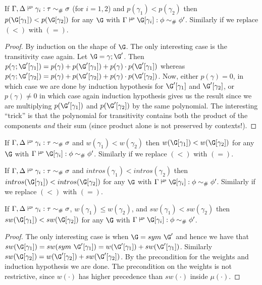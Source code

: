 \documentclass[a4paper,UKenglish]{lipics}
\def\fiddle#1{\hspace*{-0.8ex}\raisebox{0.1ex}{$\scriptscriptstyle#1$}}
\newcommand{\wfco}{\vdash^{\fiddle{\sf{co}}}}
\newcommand{\psim}{\mathrel{\sim_{\tiny \#}}}
\newcommand{\sym}[1]{\mathop{sym}\, #1}
\begin{document}
\begin{lemma} If $\Gamma,\Delta \wfco \gamma_i : \tau \psim \sigma$ (for $i=1,2$) and $p(\gamma_1) < p(\gamma_2)$ then 
$p(\G[\gamma_1]) < p(\G[\gamma_2])$ for any $\G$ with $\Gamma \wfco \G[\gamma_i] : \phi \psim \phi'$.
Similarly if we replace $(<)$ with $(=)$. 
\end{lemma}
\vspace{-10pt}\begin{proof} By induction on the shape of $\G$. The only interesting case is the transitivity case 
again. Let $\G = \gamma ; \G'$. Then $p(\gamma;\G'[\gamma_1]) = p(\gamma) + p(\G'[\gamma_1]) + p(\gamma)\cdot p(\G'[\gamma_1])$ whereas 
$p(\gamma;\G'[\gamma_2]) = p(\gamma) + p(\G'[\gamma_2]) + p(\gamma)\cdot p(\G'[\gamma_2])$. Now, either $p(\gamma) = 0$, in which case we are done
by induction hypothesis for $\G'[\gamma_1]$ and $\G'[\gamma_2]$, or $p(\gamma) \neq 0$ in which case again induction 
hypothesis gives us the result since we are multiplying $p(\G'[\gamma_1])$ and $p(\G'[\gamma_2])$ by the same polynomial.
The interesting ``trick'' is that the polynomial for transitivity contains both the product 
of the components {\em and} their sum (since product alone is not preserved by contexts!).
\end{proof}
\begin{lemma} If $\Gamma,\Delta \wfco \gamma_i : \tau \psim \sigma$ and $w(\gamma_1) < w(\gamma_2)$ then 
$w(\G[\gamma_1]) < w(\G[\gamma_2])$ for any $\G$ with $\Gamma \wfco \G[\gamma_i] : \phi \psim \phi'$.
Similarly if we replace $(<)$ with $(=)$.
\end{lemma}

\begin{lemma} If $\Gamma,\Delta \wfco \gamma_i : \tau \psim \sigma$ and $intros(\gamma_1) < intros(\gamma_2)$ then 
$intros(\G[\gamma_1]) < intros(\G[\gamma_2])$ for any $\G$ with $\Gamma \wfco \G[\gamma_i] : \phi \psim \phi'$.
Similarly if we replace $(<)$ with $(=)$. 
\end{lemma}


\begin{lemma} If $\Gamma,\Delta \wfco \gamma_i : \tau \psim \sigma$, $w(\gamma_1) \leq w(\gamma_2)$, and $sw(\gamma_1) < sw(\gamma_2)$ then 
$sw(\G[\gamma_1]) < sw(\G[\gamma_2])$ for any $\G$ with $\Gamma \wfco \G[\gamma_i] : \phi \psim \phi'$.
\end{lemma}
\vspace{-10pt}\begin{proof} The only interesting case is when $\G = \sym{\G'}$ and hence we have that 
$sw(\G[\gamma_1]) = sw(\sym{\G'[\gamma_1]}) = w(\G'[\gamma_1]) + sw(\G'[\gamma_1])$. 
Similarly $sw(\G[\gamma_2]) = w(\G'[\gamma_2]) + sw(\G'[\gamma_2])$. By the precondition for the weights and induction 
hypothesis we are done. The precondition on the weights is not restrictive, since 
$w(\cdot)$ has higher precedence than $sw(\cdot)$ inside $\mu(\cdot)$.
\end{proof}
\end{document}
